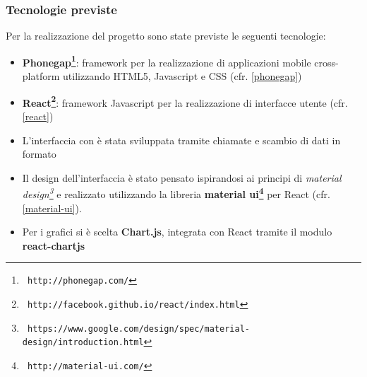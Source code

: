 \subsubsection{Tecnologie previste}
Per la realizzazione del progetto sono state previste le seguenti tecnologie:

\begin{itemize}
\item \textbf{Phonegap\footnote{\texttt{ http://phonegap.com/}}}: framework per 
la realizzazione di applicazioni mobile
cross-platform utilizzando HTML5, Javascript e CSS (cfr. \ref{phonegap})
\item \textbf{React\footnote{\texttt{ http://facebook.github.io/react/index.html}}}: 
framework Javascript per la realizzazione di interfacce utente (cfr. \ref{react})
\item L'interfaccia con \fiscoloWeb{} è stata sviluppata tramite chiamate  e
scambio di dati in formato 
\item Il design dell'interfaccia è stato pensato ispirandosi ai principi di
\textit{material design\footnote{\texttt{ https://www.google.com/design/spec/material-design/introduction.html}}} e 
realizzato utilizzando la libreria \textbf{material ui\footnote{\texttt{ http://material-ui.com/}}} per React (cfr. \ref{material-ui}).
\item Per i grafici si è scelta \textbf{Chart.js}, integrata con React tramite
il modulo \textbf{react-chartjs}
\end{itemize}

